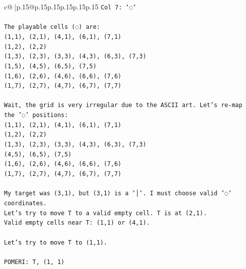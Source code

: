 \documentclass{article}
\begin{document}
{\begin{supertabular}{c@{$\;$}|p{.15\linewidth}@{}p{.15\linewidth}p{.15\linewidth}p{.15\linewidth}p{.15\linewidth}p{.15\linewidth}}
{{{\texttt{Col 7: `◌`} \\
\\ 
\texttt{The playable cells (◌) are:} \\
\texttt{(1,1), (2,1), (4,1), (6,1), (7,1)} \\
\texttt{(1,2), (2,2)} \\
\texttt{(1,3), (2,3), (3,3), (4,3), (6,3), (7,3)} \\
\texttt{(1,5), (4,5), (6,5), (7,5)} \\
\texttt{(1,6), (2,6), (4,6), (6,6), (7,6)} \\
\texttt{(1,7), (2,7), (4,7), (6,7), (7,7)} \\
\\ 
\texttt{Wait, the grid is very irregular due to the ASCII art. Let's re{-}map the '◌' positions:} \\
\texttt{(1,1), (2,1), (4,1), (6,1), (7,1)} \\
\texttt{(1,2), (2,2)} \\
\texttt{(1,3), (2,3), (3,3), (4,3), (6,3), (7,3)} \\
\texttt{(4,5), (6,5), (7,5)} \\
\texttt{(1,6), (2,6), (4,6), (6,6), (7,6)} \\
\texttt{(1,7), (2,7), (4,7), (6,7), (7,7)} \\
\\ 
\texttt{My target was (3,1), but (3,1) is a `│`. I must choose valid `◌` coordinates.} \\
\texttt{Let's try to move T to a valid empty cell. T is at (2,1).} \\
\texttt{Valid empty cells near T: (1,1) or (4,1).} \\
\\ 
\texttt{Let's try to move T to (1,1).} \\
\\ 
\texttt{POMERI: T, (1, 1)} \\
            }
        }
    }
     \\ \\


\end{supertabular}}
\end{document}
